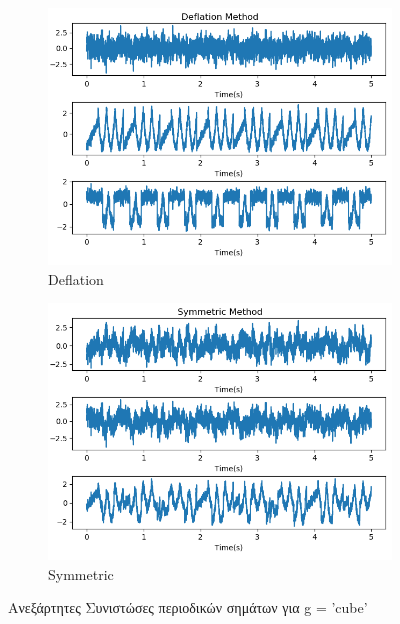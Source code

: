 \begin{figure}[H]
    \centering
    \begin{subfigure}{0.48 \textwidth}
        \centering
       \includegraphics[width=\textwidth]{fwto/cube_def.png}\en
        \caption{Deflation} \gr
        \label{fig:5.10a}
    \end{subfigure}
    \hfill
    \begin{subfigure}{0.48 \textwidth}
        \centering
       \includegraphics[width=\textwidth]{fwto/cube_sym.png}
        \en
        \caption{Symmetric} \gr
        \label{fig:5.10b}
    \end{subfigure}
    \gr
    \caption{Ανεξάρτητες Συνιστώσες περιοδικών σημάτων για \en g = 'cube' \gr}
\end{figure}
